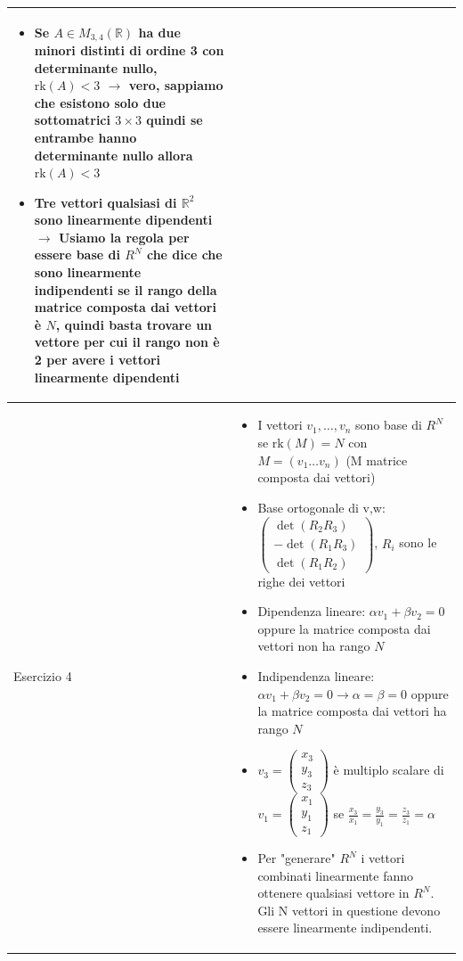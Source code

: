 \documentclass[10pt]{article}
\begin{document}
\begin{landscape}
\begin{minipage}[t]{0.49\textwidth}
\begin{tabular}{| m{1.2cm} | m{16.5cm} |}
\begin{itemize}
        \item Se $A\in M_{3,4}(\mathbb{R})$ ha due minori distinti di ordine 3 con determinante nullo, $\text{rk}(A)<3$ $\rightarrow$ vero, sappiamo che esistono solo due sottomatrici $3\times 3$ quindi se entrambe hanno determinante nullo allora $\text{rk}(A)<3$
        \item Tre vettori qualsiasi di $\mathbb{R}^{2}$ sono linearmente dipendenti $\rightarrow$ Usiamo la regola per essere base di $R^{N}$ che dice che sono linearmente indipendenti se il rango della matrice composta dai vettori è $N$, quindi basta trovare un vettore per cui il rango non è 2 per avere i vettori linearmente dipendenti  
    \end{itemize}\\
    \hline
    Esercizio 4 & \begin{itemize}
        \item I vettori $v_{1},\ldots ,v_{n}$ sono base di $R^{N}$ se $\text{rk}(M)=N$ con $M=(v_{1}\ldots v_{n})$ (M matrice composta dai vettori)
        \item Base ortogonale di v,w: $\begin{pmatrix}
            \det(R_{2}R_{3}) \\
            -\det(R_{1}R_{3}) \\
            \det(R_{1}R_{2})
        \end{pmatrix}$, $R_{i}$ sono le righe dei vettori
        \item Dipendenza lineare: $\alpha v_{1}+\beta v_{2} = 0$ oppure la matrice composta dai vettori non ha rango $N$
        \item Indipendenza lineare: $\alpha v_{1}+\beta v_{2} = 0 \rightarrow \alpha = \beta = 0$ oppure la matrice composta dai vettori ha rango $N$
        \item $v_{3}=\begin{pmatrix}
            x_{3} \\ y_{3} \\ z_{3}
        \end{pmatrix}$ è multiplo scalare di $v_{1}=\begin{pmatrix}
            x_{1} \\ y_{1} \\ z_{1}
        \end{pmatrix}$ se $\frac{x_{3}}{x_{1}}=\frac{y_{3}}{y_{1}}=\frac{z_{3}}{z_{1}}=\alpha$
        \item Per "generare" $R^{N}$ i vettori combinati linearmente fanno ottenere qualsiasi vettore in $R^{N}$. Gli N vettori in questione devono essere linearmente indipendenti.

\end{itemize}
\end{tabular}
\end{minipage}
\end{landscape}
\end{document}
